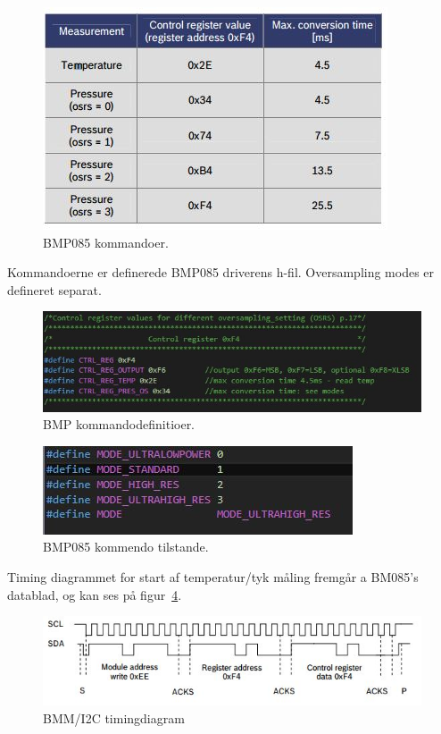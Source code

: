 \begin{figure}[h]
	\centering
	\includegraphics[width=0.6\linewidth]{figs/bmp085_commands}
	\caption{BMP085 kommandoer.}
	\label{fig:bmp085commands}
\end{figure}

Kommandoerne er definerede BMP085 driverens h-fil. Oversampling modes er defineret separat.

\begin{figure}[h]
	\centering
	\includegraphics[width=0.7\linewidth]{figs/bmp085_command_defines}
	\caption{BMP kommandodefinitioer.}
	\label{fig:bmp085commanddefines}
\end{figure}

\begin{figure}[h]
	\centering
	\includegraphics[width=0.7\linewidth]{figs/bmp085_command_modes}
	\caption{BMP085 kommendo tilstande.}
	\label{fig:bmp085commandmodes}
\end{figure}

Timing diagrammet for start af temperatur/tyk måling fremgår a BM085’s datablad, og kan ses på figur~\ref{fig:bmpi2ctiming}.

\begin{figure}[h]
	\centering
	\includegraphics[width=0.9\linewidth]{figs/bmp_i2c_timing}
	\caption{BMM/I2C timingdiagram}
	\label{fig:bmpi2ctiming}
\end{figure}

